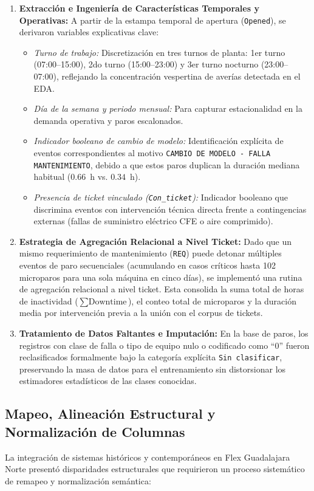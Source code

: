 \documentclass[conference]{IEEEtran}
\begin{document}
\begin{enumerate}
    \item \textbf{Extracción e Ingeniería de Características Temporales y Operativas:}
    A partir de la estampa temporal de apertura (\texttt{Opened}), se derivaron variables explicativas clave:
    \begin{itemize}
        \item \textit{Turno de trabajo:} Discretización en tres turnos de planta: 1er turno (07:00--15:00), 2do turno (15:00--23:00) y 3er turno nocturno (23:00--07:00), reflejando la concentración vespertina de averías detectada en el EDA.
        \item \textit{Día de la semana y periodo mensual:} Para capturar estacionalidad en la demanda operativa y paros escalonados.
        \item \textit{Indicador booleano de cambio de modelo:} Identificación explícita de eventos correspondientes al motivo \texttt{CAMBIO DE MODELO - FALLA MANTENIMIENTO}, debido a que estos paros duplican la duración mediana habitual ($0.66$~h vs. $0.34$~h).
        \item \textit{Presencia de ticket vinculado (\texttt{Con\_ticket}):} Indicador booleano que discrimina eventos con intervención técnica directa frente a contingencias externas (fallas de suministro eléctrico CFE o aire comprimido).
    \end{itemize}

    \item \textbf{Estrategia de Agregación Relacional a Nivel Ticket:}
    Dado que un mismo requerimiento de mantenimiento (\texttt{REQ}) puede detonar múltiples eventos de paro secuenciales (acumulando en casos críticos hasta 102 microparos para una sola máquina en cinco días), se implementó una rutina de agregación relacional a nivel ticket. Esta consolida la suma total de horas de inactividad ($\sum \text{Downtime}$), el conteo total de microparos y la duración media por intervención previa a la unión con el corpus de tickets.

    \item \textbf{Tratamiento de Datos Faltantes e Imputación:}
    En la base de paros, los registros con clase de falla o tipo de equipo nulo o codificado como ``0'' fueron reclasificados formalmente bajo la categoría explícita \texttt{Sin clasificar}, preservando la masa de datos para el entrenamiento sin distorsionar los estimadores estadísticos de las clases conocidas.
\end{enumerate}

\subsection{Mapeo, Alineación Estructural y Normalización de Columnas}
La integración de sistemas históricos y contemporáneos en Flex Guadalajara Norte presentó disparidades estructurales que requirieron un proceso sistemático de remapeo y normalización semántica:
\end{document}

